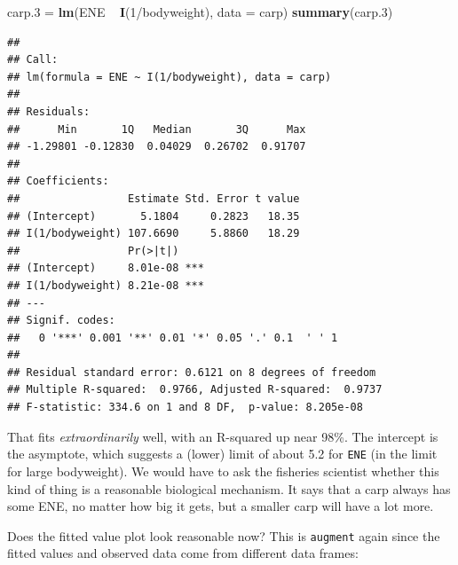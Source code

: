 \documentclass[]{tufte-book}
\newenvironment{Shaded}{}{}
\newcommand{\DataTypeTok}[1]{\textcolor[rgb]{0.56,0.13,0.00}{#1}}
\newcommand{\DecValTok}[1]{\textcolor[rgb]{0.25,0.63,0.44}{#1}}
\newcommand{\FloatTok}[1]{\textcolor[rgb]{0.25,0.63,0.44}{#1}}
\newcommand{\KeywordTok}[1]{\textcolor[rgb]{0.00,0.44,0.13}{\textbf{#1}}}
\newcommand{\NormalTok}[1]{#1}
\newcommand{\OperatorTok}[1]{\textcolor[rgb]{0.40,0.40,0.40}{#1}}
\newcommand{\StringTok}[1]{\textcolor[rgb]{0.25,0.44,0.63}{#1}}
\theoremstyle{definition}
\theoremstyle{definition}
\theoremstyle{definition}
\theoremstyle{remark}
\begin{document}
\begin{Shaded}
\begin{Highlighting}[]
\NormalTok{carp}\FloatTok{.3}\NormalTok{ =}\StringTok{ }\KeywordTok{lm}\NormalTok{(ENE }\OperatorTok{~}\StringTok{ }\KeywordTok{I}\NormalTok{(}\DecValTok{1}\OperatorTok{/}\NormalTok{bodyweight), }\DataTypeTok{data =}\NormalTok{ carp)}
\KeywordTok{summary}\NormalTok{(carp}\FloatTok{.3}\NormalTok{)}
\end{Highlighting}
\end{Shaded}

\begin{verbatim}
## 
## Call:
## lm(formula = ENE ~ I(1/bodyweight), data = carp)
## 
## Residuals:
##      Min       1Q   Median       3Q      Max 
## -1.29801 -0.12830  0.04029  0.26702  0.91707 
## 
## Coefficients:
##                 Estimate Std. Error t value
## (Intercept)       5.1804     0.2823   18.35
## I(1/bodyweight) 107.6690     5.8860   18.29
##                 Pr(>|t|)    
## (Intercept)     8.01e-08 ***
## I(1/bodyweight) 8.21e-08 ***
## ---
## Signif. codes:  
##   0 '***' 0.001 '**' 0.01 '*' 0.05 '.' 0.1  ' ' 1
## 
## Residual standard error: 0.6121 on 8 degrees of freedom
## Multiple R-squared:  0.9766, Adjusted R-squared:  0.9737 
## F-statistic: 334.6 on 1 and 8 DF,  p-value: 8.205e-08
\end{verbatim}

That fits \emph{extraordinarily} well, with an R-squared up near 98\%.
The intercept is the asymptote, which suggests a (lower) limit of about
5.2 for \texttt{ENE} (in the limit for large bodyweight). We would have
to ask the fisheries scientist whether this kind of thing is a
reasonable biological mechanism. It says that a carp always has some
ENE, no matter how big it gets, but a smaller carp will have a lot more.

Does the fitted value plot look reasonable now? This is \texttt{augment}
again since the fitted values and observed data come from different data
frames:

\begin{Shaded}
\end{Shaded}
\end{document}
